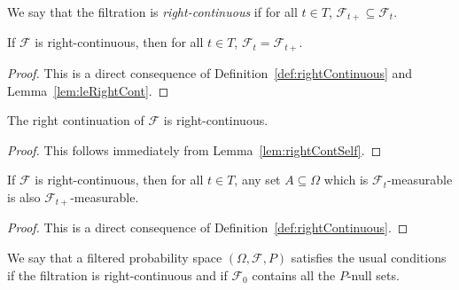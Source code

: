 \begin{definition}\label{def:rightContinuous}
  \leanok
We say that the filtration is \emph{right-continuous} if for all $t \in T$, $\mathcal{F}_{t+} \subseteq \mathcal{F}_t$.
\end{definition}

\begin{lemma}\label{lem:eqRightCont}
  \leanok
If $\mathcal{F}$ is right-continuous, then for all $t \in T$, $\mathcal{F}_t = \mathcal{F}_{t+}$.
\end{lemma}

\begin{proof}\leanok
This is a direct consequence of Definition~\ref{def:rightContinuous} and Lemma~\ref{lem:leRightCont}.
\end{proof}

\begin{lemma}\label{lem:rightContinuousRightCont}
  \leanok
The right continuation of $\mathcal{F}$ is right-continuous.
\end{lemma}

\begin{proof}\leanok
This follows immediately from Lemma~\ref{lem:rightContSelf}.
\end{proof}

\begin{lemma}\label{lem:rightContinuousMeasurableSet}
  \leanok
If $\mathcal{F}$ is right-continuous, then for all $t \in T$, any set $A \subseteq \Omega$ which is $\mathcal{F}_t$-measurable is also $\mathcal{F}_{t+}$-measurable.
\end{lemma}

\begin{proof}\leanok
This is a direct consequence of Definition~\ref{def:rightContinuous}.
\end{proof}

\begin{definition}\label{def:hasUsualConditions}
  \leanok
We say that a filtered probability space $(\Omega, \mathcal{F}, P)$ satisfies the usual conditions if the filtration is right-continuous and if $\mathcal{F}_0$ contains all the $P$-null sets.
\end{definition}




